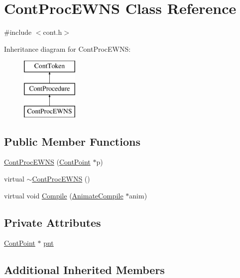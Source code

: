 \hypertarget{a00069}{\section{Cont\-Proc\-E\-W\-N\-S Class Reference}
\label{a00069}
}


{\ttfamily \#include $<$cont.\-h$>$}

Inheritance diagram for Cont\-Proc\-E\-W\-N\-S\-:\begin{figure}[H]
\begin{center}
\leavevmode
\includegraphics[height=3.000000cm]{a00069}
\end{center}
\end{figure}
\subsection*{Public Member Functions}
\begin{DoxyCompactItemize}
\item 
\hyperlink{a00069_a8fe73f6c99ec2b7e4fa1d16b9777cd88}{Cont\-Proc\-E\-W\-N\-S} (\hyperlink{a00062}{Cont\-Point} $\ast$p)
\item 
virtual \hyperlink{a00069_ab3b2c3219f33f940cbe26ace3f4962b0}{$\sim$\-Cont\-Proc\-E\-W\-N\-S} ()
\item 
virtual void \hyperlink{a00069_abf051788c6e6c552661a40f8179c11ee}{Compile} (\hyperlink{a00007}{Animate\-Compile} $\ast$anim)
\end{DoxyCompactItemize}
\subsection*{Private Attributes}
\begin{DoxyCompactItemize}
\item 
\hyperlink{a00062}{Cont\-Point} $\ast$ \hyperlink{a00069_a8fbfa9a491ffb84d2786b78d7dd76004}{pnt}
\end{DoxyCompactItemize}
\subsection*{Additional Inherited Members}


